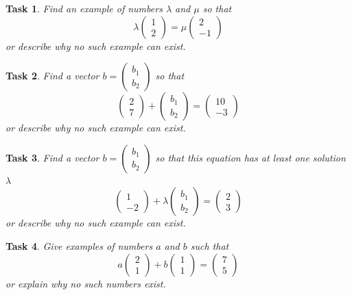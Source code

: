 \documentclass[10pt,]{book}
\theoremstyle{plain}
\numberwithin{equation}{section}
\newtheorem{task}{Task}[chapter]
\begin{document}
\begin{task}
\label{task-1}
Find an example of numbers \(\lambda\) and \(\mu\) so that \[\lambda \begin{pmatrix} 1 \\ 2 \end{pmatrix} = \mu \begin{pmatrix} 2 \\ -1 \end{pmatrix}\] or describe why no such example can exist.%
\end{task}
\begin{task}
\label{task-2}
Find a vector \(b = \left( \begin{smallmatrix} b_1 \\ b_2
                  \end{smallmatrix} \right)\) so that \[ \begin{pmatrix} 2
                  \\ 7 \end{pmatrix} + \begin{pmatrix} b_1 \\ b_2 \end{pmatrix}
                  = \begin{pmatrix} 10 \\ -3 \end{pmatrix}\] or describe why
                  no such example can exist.%
\end{task}
\begin{task}
\label{task-3}
Find a vector \(b = \left( \begin{smallmatrix} b_1 \\ b_2
                  \end{smallmatrix} \right)\) so that this equation has at
                  least one solution \(\lambda\) \[\begin{pmatrix} 1 \\ -2
                  \end{pmatrix} + \lambda \begin{pmatrix} b_1 \\ b_2 \end{pmatrix}
                  = \begin{pmatrix} 2 \\ 3 \end{pmatrix}\] or describe why no
                  such example can exist.%
\end{task}
\begin{task}
\label{task-4}
Give examples of numbers \(a\) and \(b\) such that \[ a \begin{pmatrix} 2 \\ 1 \end{pmatrix} + b \begin{pmatrix} 1 \\ 1 \end{pmatrix} = \begin{pmatrix} 7 \\ 5 \end{pmatrix}\] or explain why no such numbers exist.%
\end{task}
\end{document}
